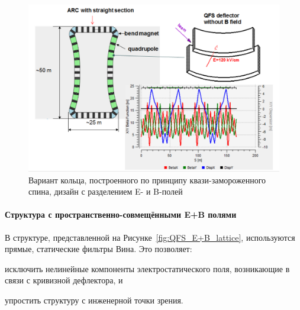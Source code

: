 \begin{figure}[H]
	\centering
	\includegraphics[width=\linewidth,trim=0 2 0 0, clip]{images/chapter2/6_3_lattice}
	\caption{Вариант кольца, построенного по принципу квази-замороженного спина, 
		дизайн с разделением E- и B-полей
	\label{fig:QFS_6_3_lattice}}
\end{figure}

\paragraph{Структура с пространственно-совмещёнными E+B полями}\label{chpt2:lattice:QFS:EB}

В структуре, представленной на Рисунке~\ref{fig:QFS_E+B_lattice}, используются прямые, 
статические фильтры Вина. Это позволяет:
\begin{enumerate*}
	\item исключить нелинейные компоненты электростатического поля, 
	возникающие в связи с кривизной дефлектора, и 
	\item упростить структуру с инженерной точки зрения.
\end{enumerate*}

